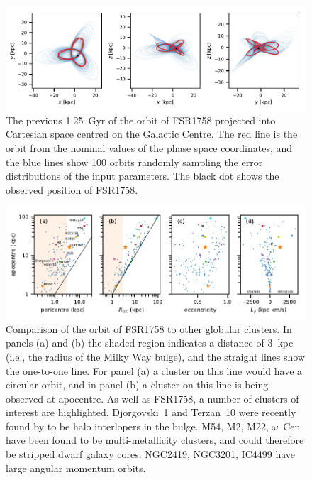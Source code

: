 \documentclass[fleqn,usenatbib]{mnras}
\begin{document}
\begin{figure}
	\includegraphics[width=\textwidth]{figures/orbit.pdf}
    \caption{The previous 1.25~Gyr of the orbit of FSR1758 projected into Cartesian space centred on the Galactic Centre. The red line is the orbit from the nominal values of the phase space coordinates, and the blue lines show 100 orbits randomly sampling the error distributions of the input parameters. The black dot shows the observed position of FSR1758.}
    \label{fig:orbit}
\end{figure}

\begin{figure}
	\includegraphics[width=\textwidth]{figures/orbit_comparison.pdf}
    \caption{Comparison of the orbit of FSR1758 to other globular clusters. In panels (a) and (b) the shaded region indicates a distance of 3~kpc (i.e., the radius of the Milky Way bulge), and the straight lines show the one-to-one line. For panel (a) a cluster on this line would have a circular orbit, and in panel (b) a cluster on this line is being observed at apocentre. As well as FSR1758, a number of clusters of interest are highlighted. Djorgovski~1 and Terzan~10 were recently found by \citet{Ortolani2019} to be halo interlopers in the bulge. M54, M2, M22, $\omega$~Cen have been found to be multi-metallicity clusters, and could therefore be stripped dwarf galaxy cores. NGC2419, NGC3201, IC4499 have large angular momentum orbits.}
    \label{fig:orbit_comparison.pdf}
\end{figure}
\end{document}
